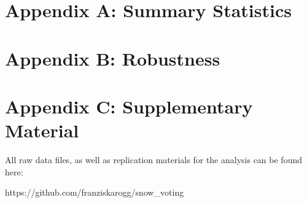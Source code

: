 \documentclass{article}
\begin{document}
\newpage

\section*{Appendix A: Summary Statistics}
\label{app:A}

\begin{table}[H]
  \caption{\textit{Descriptive Statistics of Main Variables}}
  \label{tab:summary}
  
\end{table}

\newpage

\section*{Appendix B: Robustness}
\label{app:B}

\begin{table}[H]
  \caption{\textit{Robustness: Maximum Snow Depth (2023/24)}}
  \label{tab:robustness}
  
\end{table}
\newpage



\section*{Appendix C: Supplementary Material}

\noindent All raw data files, as well as replication materials for the analysis can be found here: 

\noindent https://github.com/franziskarogg/snow\_voting
\end{document}
